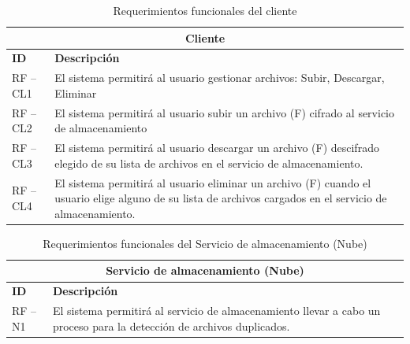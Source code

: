 \begin{table}[htb]
\centering
\begin{tabular}{| p{2cm} | p{13.5cm} |}
\hline
\multicolumn{2}{|c|}{\textbf{Cliente}} \\ \hline
\textbf{ID} & \textbf{Descripción} \\
\hline \hline
RF – CL1 & El sistema permitirá al usuario gestionar archivos: Subir, Descargar, Eliminar \\ \hline
RF – CL2 & El sistema permitirá al usuario subir un archivo (F) cifrado al servicio de almacenamiento \\ \hline
RF – CL3 & El sistema permitirá al usuario descargar un archivo (F) descifrado elegido de su lista de archivos en el servicio de almacenamiento. \\ \hline
RF – CL4 &El sistema permitirá al usuario eliminar un archivo (F) cuando el usuario elige alguno de su lista de archivos cargados en el servicio de almacenamiento. \\ \hline
\end{tabular}
\caption{Requerimientos funcionales del cliente}
\label{Cliente }
\end{table}


\begin{table}[htb]
\centering
\begin{tabular}{| p{2cm} | p{13.5cm} |}
\hline
\multicolumn{2}{|c|}{\textbf{Servicio de almacenamiento (Nube)}} \\ \hline
\textbf{ID} & \textbf{Descripción} \\
\hline \hline

RF – N1 & El sistema permitirá al servicio de almacenamiento llevar a cabo un proceso para la detección de archivos duplicados. \\ \hline

\end{tabular}
\caption{Requerimientos funcionales del Servicio de almacenamiento (Nube)}
\label{Servicio de almacenamiento (Nube) }
\end{table}
\vspace{9cm}
